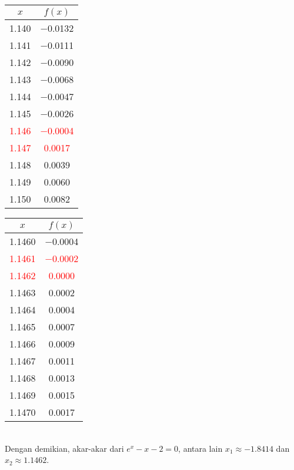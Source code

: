\documentclass{article}
\begin{document}
\begin{enumerate}
\begin{enumerate}
\begin{tabular}{|c|c|}
            \hline
            $x$   & $f(x)$ \\
            \hline
            \num{1,140} & \num{-0,0132} \\
            \num{1,141} & \num{-0,0111} \\
            \num{1,142} & \num{-0,0090} \\
            \num{1,143} & \num{-0,0068} \\
            \num{1,144} & \num{-0,0047} \\
            \num{1,145} & \num{-0,0026} \\
            \textcolor{red}{\num{1,146}} & \textcolor{red}{\num{-0,0004}} \\
            \textcolor{red}{\num{1,147}} & \textcolor{red}{\num{0,0017}} \\
            \num{1,148} & \num{0,0039} \\
            \num{1,149} & \num{0,0060} \\
            \num{1,150} & \num{0,0082} \\
            \hline
            \end{tabular}\quad
            \begin{tabular}{|c|c|}
            \hline
            $x$   & $f(x)$ \\
            \hline
            \num{1,1460} & \num{-0,0004} \\
            \textcolor{red}{\num{1,1461}} & \textcolor{red}{\num{-0,0002}} \\
            \textcolor{red}{\num{1,1462}} & \textcolor{red}{\num{0,0000}} \\
            \num{1,1463} & \num{0,0002} \\
            \num{1,1464} & \num{0,0004} \\
            \num{1,1465} & \num{0,0007} \\
            \num{1,1466} & \num{0,0009} \\
            \num{1,1467} & \num{0,0011} \\
            \num{1,1468} & \num{0,0013} \\
            \num{1,1469} & \num{0,0015} \\
            \num{1,1470} & \num{0,0017} \\
            \hline
            \end{tabular}\quad \\
    
        Dengan demikian, akar-akar dari $e^x - x - 2 = 0$, antara lain $x_1 \approx \num{-1,8414}$ dan $x_2 \approx \num{1,1462}$.\\
    

\end{enumerate}
\end{enumerate}
\end{document}
